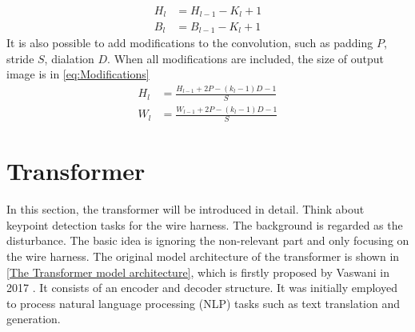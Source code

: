   \begin{equation}
  \begin{aligned}
    H_{l}&=H_{l-1}-K_{l}+1\\
    B_{l}&=B_{l-1}-K_{l}+1
      \label{eq:CNN size change}
  \end{aligned}
  \end{equation}
  It is also possible to add modifications to the convolution, such as padding $P$, stride $S$, dialation $D$. When all modifications are included, the size of output image is in \autoref{eq:Modifications} 
  \begin{equation}
  \begin{aligned}
    H_{l}&=\frac{H_{l-1}+2P-(k_{l}-1)D-1}{S}\\
    W_{l}&=\frac{W_{l-1}+2P-(k_{l}-1)D-1}{S}
      \label{eq:Modifications}
  \end{aligned}
  \end{equation}
\section{Transformer}
  In this section, the transformer will be introduced in detail. Think about keypoint detection tasks for the wire harness. The background is regarded as 
  the disturbance. The basic idea is ignoring the non-relevant part and only focusing on the wire harness. 
  The original model architecture of the transformer is shown in \autoref{The Transformer model architecture}, which is firstly proposed by Vaswani in 2017 \cite{NIPS2017_3f5ee243}. 
  It consists of an encoder and decoder structure. 
  It was initially employed to process natural language processing (NLP) tasks such as text translation and generation. 
